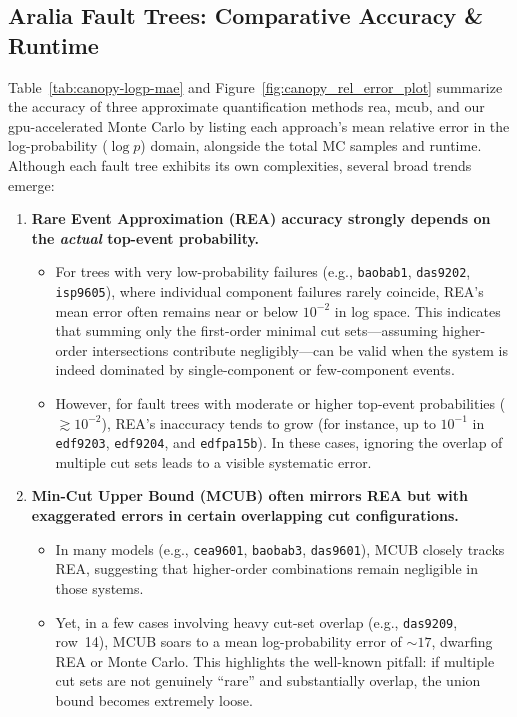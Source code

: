 \subsection{Aralia Fault Trees: Comparative Accuracy \& Runtime}


Table~\ref{tab:canopy-logp-mae} and Figure~\ref{fig:canopy_rel_error_plot} summarize the accuracy of three approximate quantification methods \acrfull{rea}, \acrfull{mcub}, and our \acrshort{gpu}-accelerated Monte Carlo by listing each approach's mean relative error in the log-probability (\(\log p\)) domain, alongside the total MC samples and runtime. Although each fault tree exhibits its own complexities, several broad trends emerge:

\begin{enumerate}
    \item \textbf{Rare Event Approximation (REA) accuracy strongly depends on the \emph{actual} top-event probability.}
    \begin{itemize}
        \item For trees with very low-probability failures (e.g., \texttt{baobab1}, \texttt{das9202}, \texttt{isp9605}), where individual component failures rarely coincide, REA's mean error often remains near or below \(10^{-2}\) in log space. This indicates that summing only the first-order minimal cut sets—assuming higher-order intersections contribute negligibly—can be valid when the system is indeed dominated by single-component or few-component events.
        \item However, for fault trees with moderate or higher top-event probabilities (\(\gtrsim 10^{-2}\)), REA's inaccuracy tends to grow (for instance, up to \(10^{-1}\) in \texttt{edf9203}, \texttt{edf9204}, and \texttt{edfpa15b}). In these cases, ignoring the overlap of multiple cut sets leads to a visible systematic error.
    \end{itemize}

    \item \textbf{Min-Cut Upper Bound (MCUB) often mirrors REA but with exaggerated errors in certain overlapping cut configurations.}
    \begin{itemize}
        \item In many models (e.g., \texttt{cea9601}, \texttt{baobab3}, \texttt{das9601}), MCUB closely tracks REA, suggesting that higher-order combinations remain negligible in those systems.
        \item Yet, in a few cases involving heavy cut-set overlap (e.g., \texttt{das9209}, row~14), MCUB soars to a mean log-probability error of \(\sim 17\), dwarfing REA or Monte Carlo. This highlights the well-known pitfall: if multiple cut sets are not genuinely ``rare'' and substantially overlap, the union bound becomes extremely loose.
    \end{itemize}


\end{enumerate}
